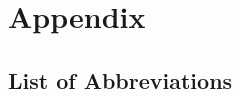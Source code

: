 \chapter{Appendix}

\section{List of Abbreviations}

\begin{acronym}
	\setlength{\itemsep}{-\parsep}
\end{acronym}
